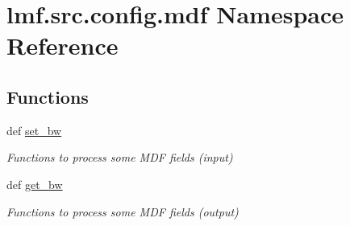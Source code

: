 \hypertarget{namespacelmf_1_1src_1_1config_1_1mdf}{\section{lmf.\+src.\+config.\+mdf Namespace Reference}
\label{namespacelmf_1_1src_1_1config_1_1mdf}
}
\subsection*{Functions}
\begin{DoxyCompactItemize}
\item 
def \hyperlink{namespacelmf_1_1src_1_1config_1_1mdf_ab9d98a9297210440ed93a3ca490ee7b4}{set\+\_\+bw}
\begin{DoxyCompactList}\small\item\em Functions to process some M\+D\+F fields (input) \end{DoxyCompactList}\item 
def \hyperlink{namespacelmf_1_1src_1_1config_1_1mdf_a5af3cc74d2bb8b03d7657c0e7fb3598b}{get\+\_\+bw}
\begin{DoxyCompactList}\small\item\em Functions to process some M\+D\+F fields (output) \end{DoxyCompactList}\end{DoxyCompactItemize}
